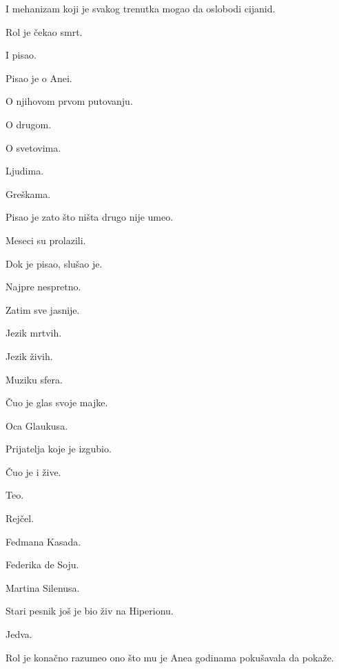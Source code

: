 I mehanizam koji je svakog trenutka mogao da oslobodi cijanid.

\bigskip

Rol je čekao smrt.

\bigskip

I pisao.

\bigskip

Pisao je o Anei.

O njihovom prvom putovanju.

O drugom.

O svetovima.

Ljudima.

Greškama.

\bigskip

Pisao je zato što ništa drugo nije umeo.

\bigskip

Meseci su prolazili.

\bigskip

Dok je pisao, slušao je.

\bigskip

Najpre nespretno.

Zatim sve jasnije.

\bigskip

Jezik mrtvih.

Jezik živih.

Muziku sfera.

\bigskip

Čuo je glas svoje majke.

Oca Glaukusa.

Prijatelja koje je izgubio.

\bigskip

Čuo je i žive.

\bigskip

Teo.

Rejčel.

Fedmana Kasada.

Federika de Soju.

\bigskip

Martina Silenusa.

\bigskip

Stari pesnik još je bio živ na Hiperionu.

\bigskip

Jedva.

\bigskip

Rol je konačno razumeo ono što mu je Anea godinama pokušavala da pokaže.

\bigskip

